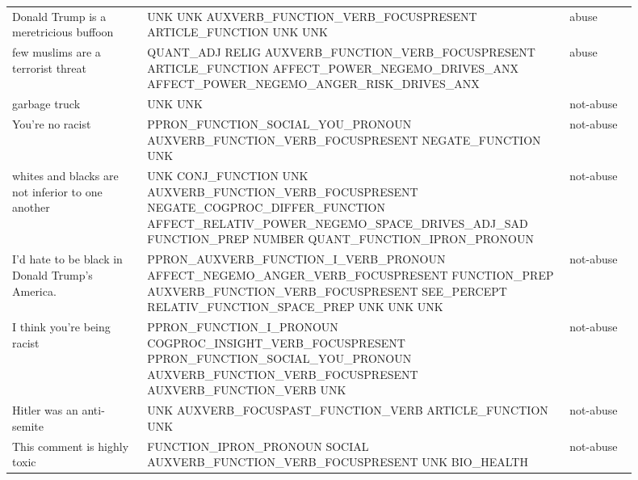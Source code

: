 \begin{longtable}[c]{p{0.2\linewidth} p{0.6\linewidth} p{0.1\linewidth}}
Donald Trump is a meretricious buffoon                & UNK UNK AUXVERB_FUNCTION_VERB_FOCUSPRESENT ARTICLE_FUNCTION UNK UNK                                                                                                                                              & abuse      \\
few muslims are a terrorist threat                    & QUANT_ADJ RELIG AUXVERB_FUNCTION_VERB_FOCUSPRESENT ARTICLE_FUNCTION AFFECT_POWER_NEGEMO_DRIVES_ANX AFFECT_POWER_NEGEMO_ANGER_RISK_DRIVES_ANX                                                                     & abuse      \\
garbage truck                                         & UNK UNK                                                                                                                                                                                                          & not-abuse  \\
You're no racist                                      & PPRON_FUNCTION_SOCIAL_YOU_PRONOUN AUXVERB_FUNCTION_VERB_FOCUSPRESENT NEGATE_FUNCTION UNK                                                                                                                         & not-abuse  \\
whites and blacks are not inferior to one another     & UNK CONJ_FUNCTION UNK AUXVERB_FUNCTION_VERB_FOCUSPRESENT NEGATE_COGPROC_DIFFER_FUNCTION AFFECT_RELATIV_POWER_NEGEMO_SPACE_DRIVES_ADJ_SAD FUNCTION_PREP NUMBER QUANT_FUNCTION_IPRON_PRONOUN                       & not-abuse  \\
I'd hate to be black in Donald Trump's America.       & PPRON_AUXVERB_FUNCTION_I_VERB_PRONOUN AFFECT_NEGEMO_ANGER_VERB_FOCUSPRESENT FUNCTION_PREP AUXVERB_FUNCTION_VERB_FOCUSPRESENT SEE_PERCEPT RELATIV_FUNCTION_SPACE_PREP UNK UNK UNK                                 & not-abuse  \\
I think you're being racist                           & PPRON_FUNCTION_I_PRONOUN COGPROC_INSIGHT_VERB_FOCUSPRESENT PPRON_FUNCTION_SOCIAL_YOU_PRONOUN AUXVERB_FUNCTION_VERB_FOCUSPRESENT AUXVERB_FUNCTION_VERB UNK                                                        & not-abuse  \\
Hitler was an anti-semite                             & UNK AUXVERB_FOCUSPAST_FUNCTION_VERB ARTICLE_FUNCTION UNK                                                                                                                                                         & not-abuse  \\
This comment is highly toxic                          & FUNCTION_IPRON_PRONOUN SOCIAL AUXVERB_FUNCTION_VERB_FOCUSPRESENT UNK BIO_HEALTH                                                                                                                                  & not-abuse  \\

\end{longtable}
